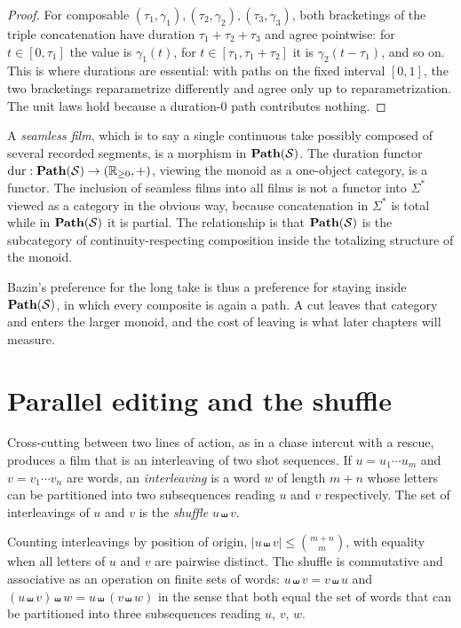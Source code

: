\begin{proof}
For composable $(\tau_1,\gamma_1),(\tau_2,\gamma_2),(\tau_3,\gamma_3)$, both bracketings of the triple concatenation have duration $\tau_1+\tau_2+\tau_3$ and agree pointwise: for $t\in[0,\tau_1]$ the value is $\gamma_1(t)$, for $t\in[\tau_1,\tau_1+\tau_2]$ it is $\gamma_2(t-\tau_1)$, and so on. This is where durations are essential: with paths on the fixed interval $[0,1]$, the two bracketings reparametrize differently and agree only up to reparametrization. The unit laws hold because a duration-$0$ path contributes nothing.
\end{proof}

A \emph{seamless film}, which is to say a single continuous take possibly composed of several recorded segments, is a morphism in $\mathbf{Path}(\mathcal{S})$. The duration functor $\operatorname{dur}:\mathbf{Path}(\mathcal{S})\to(\mathbb{R}_{\ge0},+)$, viewing the monoid as a one-object category, is a functor. The inclusion of seamless films into all films is not a functor into $\Sigma^*$ viewed as a category in the obvious way, because concatenation in $\Sigma^*$ is total while in $\mathbf{Path}(\mathcal{S})$ it is partial. The relationship is that $\mathbf{Path}(\mathcal{S})$ is the subcategory of continuity-respecting composition inside the totalizing structure of the monoid.

Bazin's preference for the long take is thus a preference for staying inside $\mathbf{Path}(\mathcal{S})$, in which every composite is again a path. A cut leaves that category and enters the larger monoid, and the cost of leaving is what later chapters will measure.

\section{Parallel editing and the shuffle}

Cross-cutting between two lines of action, as in a chase intercut with a rescue, produces a film that is an interleaving of two shot sequences. If $u=u_1\cdots u_m$ and $v=v_1\cdots v_n$ are words, an \emph{interleaving} is a word $w$ of length $m+n$ whose letters can be partitioned into two subsequences reading $u$ and $v$ respectively. The set of interleavings of $u$ and $v$ is the \emph{shuffle} $u\shuffle v$.

\begin{proposition}\label{prop:shuffle-count}
Counting interleavings by position of origin, $\lvert u\shuffle v\rvert\le\binom{m+n}{m}$, with equality when all letters of $u$ and $v$ are pairwise distinct. The shuffle is commutative and associative as an operation on finite sets of words: $u\shuffle v=v\shuffle u$ and $(u\shuffle v)\shuffle w=u\shuffle(v\shuffle w)$ in the sense that both equal the set of words that can be partitioned into three subsequences reading $u$, $v$, $w$.
\end{proposition}

